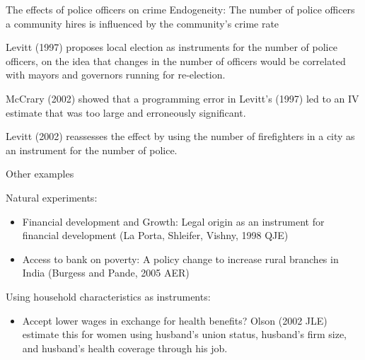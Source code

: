 \documentclass{beamer}
\begin{document}
\begin{frame}{The effects of police officers on crime}
Endogeneity:  The number of police officers a community hires is influenced by the
community's crime rate\medskip

Levitt (1997) proposes local election as instruments for the number of police officers, on the idea that changes in the number of officers would be correlated with mayors and governors running for re-election.\medskip

McCrary (2002) showed that a programming error in Levitt's (1997) led to an IV estimate
that was too large and erroneously significant.\medskip

Levitt (2002) reassesses the effect by using the number of firefighters in a city as an instrument for the number of police.

\end{frame}

\begin{frame}{Other examples}

Natural experiments:
\begin{itemize}
\item Financial development and Growth: Legal origin as an instrument for financial development (La Porta, Shleifer, Vishny, 1998 QJE)

\item Access to bank on poverty: A policy change to increase rural branches in India (Burgess and Pande, 2005 AER)
\end{itemize}\medskip
Using household characteristics as  instruments:
\begin{itemize}
\item Accept lower wages in exchange for health benefits? Olson (2002 JLE) estimate this for women using husband's union status, husband's firm size, and husband's health coverage through his job. 

\end{itemize}\end{frame}
\end{document}
